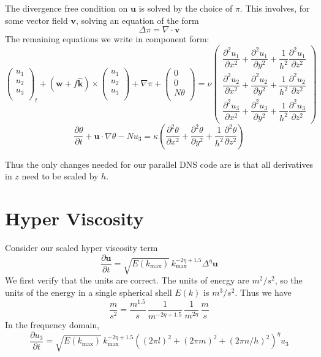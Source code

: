 \documentclass[12pt]{article}
\newcommand{\khat}{\hat{\mathbf k}}
\newcommand{\uv}{\mathbf u}
\newcommand{\omegav}{\mathbf w}
\newcommand{\grad}{\nabla}
\begin{document}
The divergence free condition on $\uv$ is solved by the choice
of $\pi$.  This involves, 
for some vector field ${\mathbf v}$, 
solving an equation of the form 
\[
\Delta \pi = \grad \cdot {\mathbf v}
\] 
The remaining equations we write in component form:
\[
\begin{pmatrix} u_1 \\
                u_2 \\
                u_3 \\
\end{pmatrix}_t
  + (\omegav + f \khat) \times 
\begin{pmatrix} u_1 \\
                u_2 \\
                u_3 \\
\end{pmatrix}
+ \grad \pi +
\begin{pmatrix} 0 \\
                0 \\
                N \theta \\
\end{pmatrix}
= \nu 
\begin{pmatrix} \dfrac{\partial^2 u_1}{\partial x^2} + 
                \dfrac{\partial^2 u_1}{\partial y^2} + 
                \dfrac{1}{h^2}\dfrac{\partial^2 u_1}{\partial z^2}   \\[5mm]
                \dfrac{\partial^2 u_2}{\partial x^2} + 
                \dfrac{\partial^2 u_2}{\partial y^2} + 
                \dfrac{1}{h^2}\dfrac{\partial^2 u_2}{\partial z^2}   \\[5mm]
                \dfrac{\partial^2 u_3}{\partial x^2} + 
                \dfrac{\partial^2 u_3}{\partial y^2} + 
                \dfrac{1}{h^2}\dfrac{\partial^2 u_3}{\partial z^2}
\end{pmatrix}
\]
\[
\frac{ \partial  \theta }{\partial t}  + \uv \cdot \grad \theta - 
N u_3  = \kappa \left(
                \dfrac{\partial^2 \theta}{\partial x^2} + 
                \dfrac{\partial^2 \theta}{\partial y^2} + 
                \dfrac{1}{h^2}\dfrac{\partial^2 \theta}{\partial z^2}
\right)
\]



Thus the only changes needed for our parallel DNS code are is that
all derivatives in $z$ need to be scaled by $h$.


\section{Hyper Viscosity}
Consider our scaled hyper viscosity term
\[
\frac{ \partial  \uv }{\partial t} = 
\sqrt{E(k_\textrm{max})} \,  k_\textrm{max}^{-2\eta + 1.5}  \Delta^\eta \uv
\]
We first verify that the units are correct.  The units of
energy are $m^2/s^2$, so the units of the energy in a single
spherical shell $E(k)$ is $m^3/s^2$.  Thus we have
\[
\frac{m}{s^2} = \frac{m^{1.5}}{s} \,\frac{1}{m^{-2\eta+1.5}}  
                          \,\frac{1}{m^{2\eta}}
                           \, \frac{m}{s}
\]
In the frequency domain, 
\[
\frac{ \partial  u_3 }{\partial t} = 
\sqrt{E(k_\textrm{max})} \,  k_\textrm{max}^{-2\eta + 1.5}  
( (2\pi l)^2 + (2\pi m)^2 + (2\pi n/h)^2)^\eta u_3
\]
\end{document}
